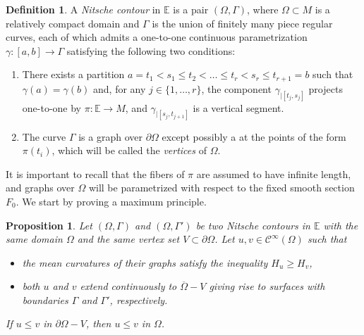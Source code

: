 \documentclass[a4paper,10pt,reqno]{amsart}
\newcommand{\E}{\mathbb{E}}
\newcommand{\sm}{-}
\newtheorem{proposition}[theorem]{Proposition}
\theoremstyle{definition}
\newtheorem{definition}[theorem]{Definition}
\theoremstyle{remark}
\numberwithin{equation}{section}
\begin{document}
\begin{definition}\label{def:nitsche}
A {\em Nitsche contour} in $\mathbb{E}$ is a pair $(\Omega,\Gamma)$, where $\Omega\subset M$ is a relatively compact domain and $\Gamma$ is the union of finitely many piece regular curves, each of which admits a one-to-one continuous parametrization $\gamma:[a,b]\to\Gamma$ satisfying the following two conditions:
\begin{enumerate}[label=(\alph*)]
	\item There exists a partition $a=t_1<s_1\leq t_2<\ldots\leq t_r<s_r\leq t_{r+1}=b$ such that $\gamma(a)=\gamma(b)$ and, for any $j\in\{1,\ldots,r\}$, the component $\gamma_{|[t_j,s_j]}$ projects one-to-one by $\pi:{\E}\to M$, and $\gamma_{|[s_j,t_{j+1}]}$ is a vertical segment.

	\item The curve $\Gamma$ is a graph over $\partial\Omega$ except possibly a at the points of the form $\pi(t_i)$, which will be called the \emph{vertices} of $\Omega$.
\end{enumerate}
\end{definition}
	
It is important to recall that the fibers of $\pi$ are assumed to have infinite length, and graphs over $\Omega$ will be parametrized with respect to the fixed smooth section $F_0$. We start by proving a maximum principle.
	
\begin{proposition}\label{prop:uniqueness}
Let $(\Omega,\Gamma)$ and $(\Omega,\Gamma')$  be two Nitsche contours in $\E$ with the same domain $\Omega$ and the same vertex set $V\subset\partial\Omega$. Let $u,v\in\mathcal{C}^\infty(\Omega)$ such that
\begin{itemize}
	\item[i)] the mean curvatures of their graphs satisfy the inequality $H_u\geq H_v$,
	\item[ii)] both $u$ and $v$ extend continuously to $\overline\Omega\sm V$ giving rise to surfaces with boundaries $\Gamma$ and $\Gamma'$, respectively.
\end{itemize}
If $u\leq v$ in $\partial\Omega\sm V$, then $u\leq v$ in $\Omega$.
\end{proposition}
	
\end{document}
